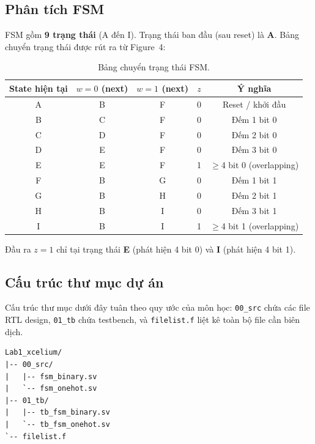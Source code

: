 \documentclass[12pt, a4paper]{article}
\begin{document}
\subsection{Phân tích FSM}
\label{subsec:exp3-fsm}

FSM gồm \textbf{9 trạng thái} (A đến I). Trạng thái ban đầu (sau reset) là \textbf{A}. Bảng chuyển trạng thái được rút ra từ Figure~4:

\begin{table}[H]
\centering
\caption{Bảng chuyển trạng thái FSM.}
\label{tab:state-transition}
\begin{tabular}{ccccc}
\toprule
\textbf{State hiện tại} & \textbf{$w=0$ (next)} & \textbf{$w=1$ (next)} & \textbf{$z$} & \textbf{Ý nghĩa} \\
\midrule
A & B & F & 0 & Reset / khởi đầu \\
B & C & F & 0 & Đếm 1 bit 0 \\
C & D & F & 0 & Đếm 2 bit 0 \\
D & E & F & 0 & Đếm 3 bit 0 \\
E & E & F & 1 & $\geq$4 bit 0 (overlapping) \\
F & B & G & 0 & Đếm 1 bit 1 \\
G & B & H & 0 & Đếm 2 bit 1 \\
H & B & I & 0 & Đếm 3 bit 1 \\
I & B & I & 1 & $\geq$4 bit 1 (overlapping) \\
\bottomrule
\end{tabular}
\end{table}

Đầu ra $z = 1$ chỉ tại trạng thái \textbf{E} (phát hiện 4 bit 0) và \textbf{I} (phát hiện 4 bit 1).

\subsection{Cấu trúc thư mục dự án}
\label{subsec:exp3-tree}

\begin{warnbox}
Cấu trúc thư mục dưới đây tuân theo quy ước của môn học: \texttt{00\_src} chứa các file RTL design, \texttt{01\_tb} chứa testbench, và \texttt{filelist.f} liệt kê toàn bộ file cần biên dịch.
\end{warnbox}

\begin{lstlisting}[style=bash_custom, caption={Cấu trúc thư mục Experiment 3 (lệnh \texttt{tree} trên Linux).}]
Lab1_xcelium/
|-- 00_src/
|   |-- fsm_binary.sv
|   `-- fsm_onehot.sv
|-- 01_tb/
|   |-- tb_fsm_binary.sv
|   `-- tb_fsm_onehot.sv
`-- filelist.f
\end{lstlisting}
\end{document}
